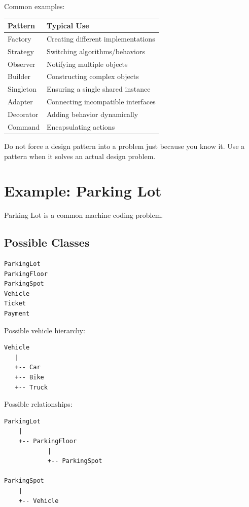 \documentclass[12pt,a4paper]{article}
\begin{document}
Common examples:

\begin{center}
\begin{tabular}{p{} p{}}
\toprule
\textbf{Pattern} & \textbf{Typical Use}\\
\midrule
Factory & Creating different implementations\\
Strategy & Switching algorithms/behaviors\\
Observer & Notifying multiple objects\\
Builder & Constructing complex objects\\
Singleton & Ensuring a single shared instance\\
Adapter & Connecting incompatible interfaces\\
Decorator & Adding behavior dynamically\\
Command & Encapsulating actions\\
\bottomrule
\end{tabular}
\end{center}

Do not force a design pattern into a problem just because you know it. Use a pattern when it solves an actual design problem.

\section{Example: Parking Lot}

Parking Lot is a common machine coding problem.

\subsection{Possible Classes}

\begin{verbatim}
ParkingLot
ParkingFloor
ParkingSpot
Vehicle
Ticket
Payment
\end{verbatim}

Possible vehicle hierarchy:

\begin{verbatim}
Vehicle
   |
   +-- Car
   +-- Bike
   +-- Truck
\end{verbatim}

Possible relationships:

\begin{verbatim}
ParkingLot
    |
    +-- ParkingFloor
            |
            +-- ParkingSpot

ParkingSpot
    |
    +-- Vehicle
\end{verbatim}
\end{document}
